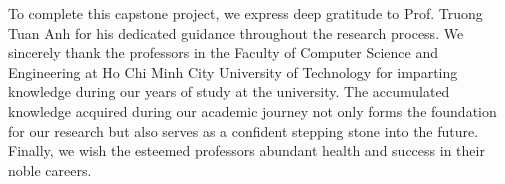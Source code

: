 To complete this capstone project, we express deep gratitude to Prof. Truong Tuan Anh for his dedicated guidance throughout the research process. We sincerely thank the professors in the Faculty of Computer Science and Engineering at Ho Chi Minh City University of Technology for imparting knowledge during our years of study at the university. The accumulated knowledge acquired during our academic journey not only forms the foundation for our research but also serves as a confident stepping stone into the future. Finally, we wish the esteemed professors abundant health and success in their noble careers.